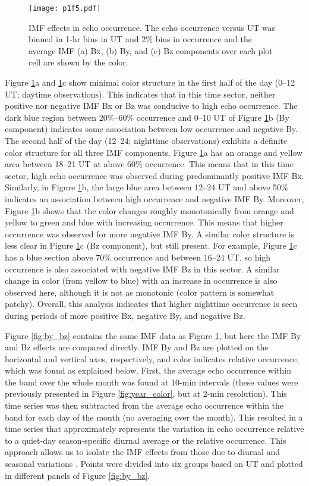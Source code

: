 \begin{figure}
\texttt{[image: p1f5.pdf]}
\caption{IMF effects in echo occurrence. The echo occurrence versus UT was binned in 1-hr bins in UT and 2\% bins in occurrence and the average IMF (a) Bx, (b) By, and (c) Bz components over each plot cell are shown by the color.}
\label{fig:ut_occ}
\end{figure}

Figure \ref{fig:ut_occ}a and \ref{fig:ut_occ}c show minimal color structure in the first half of the day (0--12 UT; daytime observations). This indicates that in this time sector, neither positive nor negative IMF Bx or Bz was conducive to high echo occurrence. The dark blue region between 20\%--60\% occurrence and 0--10 UT of Figure \ref{fig:ut_occ}b (By component) indicates some association between low occurrence and negative By. The second half of the day (12--24; nighttime observations) exhibits a definite color structure for all three IMF components. Figure \ref{fig:ut_occ}a has an orange and yellow area between 18--21 UT at above 60\% occurrence. This means that in this time sector, high echo occurrence was observed during predominantly positive IMF Bx. Similarly, in Figure \ref{fig:ut_occ}b, the large blue area between 12--24 UT and above 50\% indicates an association between high occurrence and negative IMF By. Moreover, Figure \ref{fig:ut_occ}b shows that the color changes roughly monotonically from orange and yellow to green and blue with increasing occurrence. This means that higher occurrence was observed for more negative IMF By. A similar color structure is less clear in Figure \ref{fig:ut_occ}c (Bz  component), but still present. For example, Figure \ref{fig:ut_occ}c has a blue section above 70\% occurrence and between 16--24 UT, so high occurrence is also associated with negative IMF Bz in this sector. A similar change in color (from yellow to blue) with an increase in occurrence is also observed here, although it is not as monotonic (color pattern is somewhat patchy). Overall, this analysis indicates that higher nighttime occurrence is seen during periods of more positive Bx, negative By, and negative Bz.

Figure \ref{fig:by_bz} contains the same IMF data as Figure \ref{fig:ut_occ}, but here the IMF By and Bz effects are compared directly. IMF By and Bz are plotted on the horizontal and vertical axes, respectively, and color indicates relative occurrence, which was found as explained below. First, the average echo occurrence within the band over the whole month was found at 10-min intervals (these values were previously presented in Figure \ref{fig:year_color}, but at 2-min resolution). This time series was then subtracted from the average echo occurrence within the band for each day of the month (no averaging over the month). This resulted in a time series that approximately represents the variation in echo occurrence relative to a quiet-day season-specific diurnal average or the relative occurrence. This approach allows us to isolate the IMF effects from those due to diurnal and seasonal variations \citep{Makarevich2012}. Points were divided into six groups based on UT and plotted in different panels of Figure \ref{fig:by_bz}.

